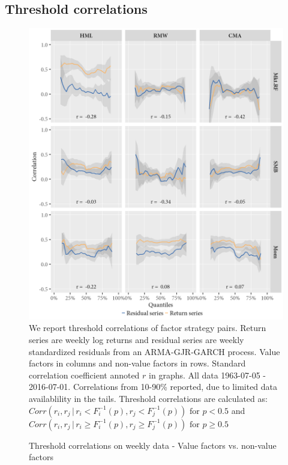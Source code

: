 \subsection{Threshold correlations}
\begin{figure}[H]
  \caption{Threshold correlations on weekly data - Value factors vs. non-value factors}
  \label{diag:thresholdnonvalue}
  \centering
  \begin{minipage}{\textwidth}
  \includegraphics[scale=1]{graphics/threshold_Nonvalue.png}  
  \vspace{3mm}
  \footnotesize
  We report threshold correlations of factor strategy pairs. Return series are weekly log returns and residual series are weekly standardized residuals from an ARMA-GJR-GARCH process. Value factors in columns and non-value factors in rows. Standard correlation coefficient annoted $r$ in graphs. All data 1963-07-05 - 2016-07-01. Correlations from 10-90\% reported, due to limited data availablility in the tails. Threshold correlations are calculated as: $Corr(r_i, r_j \,|\, r_i < F_i^{-1}(p), r_j < F_j^{-1}(p)) \text{ for } p < 0.5$ and $Corr(r_i, r_j \,|\, r_i \geq F_i^{-1}(p), r_j \geq F_j^{-1}(p)) \text{ for } p \geq 0.5$ 
  \end{minipage}
\end{figure}
